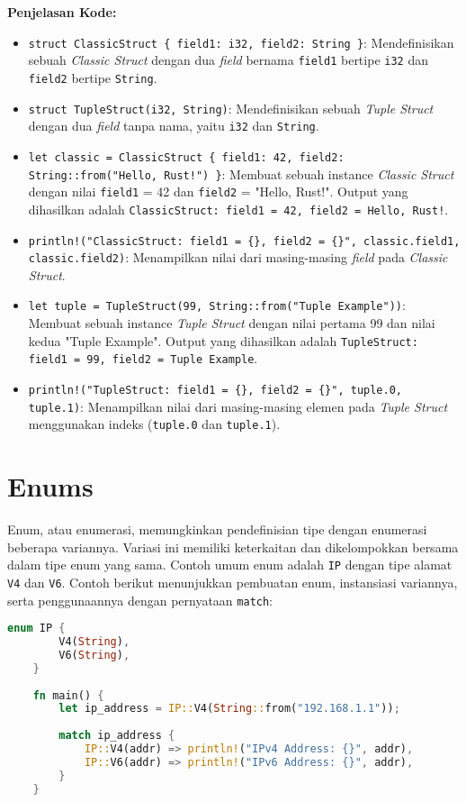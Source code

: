 \textbf{Penjelasan Kode:}
\begin{itemize}
	\item \texttt{struct ClassicStruct \{ field1: i32, field2: String \}}: Mendefinisikan sebuah \textit{Classic Struct} dengan dua \textit{field} bernama \texttt{field1} bertipe \texttt{i32} dan \texttt{field2} bertipe \texttt{String}.
	\item \texttt{struct TupleStruct(i32, String)}: Mendefinisikan sebuah \textit{Tuple Struct} dengan dua \textit{field} tanpa nama, yaitu \texttt{i32} dan \texttt{String}.
	\item \texttt{let classic = ClassicStruct \{ field1: 42, field2: String::from("Hello, Rust!") \}}: Membuat sebuah instance \textit{Classic Struct} dengan nilai \texttt{field1} = 42 dan \texttt{field2} = "Hello, Rust!". Output yang dihasilkan adalah \texttt{ClassicStruct: field1 = 42, field2 = Hello, Rust!}.
	\item \texttt{println!("ClassicStruct: field1 = \{\}, field2 = \{\}", classic.field1, classic.field2)}: Menampilkan nilai dari masing-masing \textit{field} pada \textit{Classic Struct}.
	\item \texttt{let tuple = TupleStruct(99, String::from("Tuple Example"))}: Membuat sebuah instance \textit{Tuple Struct} dengan nilai pertama 99 dan nilai kedua "Tuple Example". Output yang dihasilkan adalah \texttt{TupleStruct: field1 = 99, field2 = Tuple Example}.
	\item \texttt{println!("TupleStruct: field1 = \{\}, field2 = \{\}", tuple.0, tuple.1)}: Menampilkan nilai dari masing-masing elemen pada \textit{Tuple Struct} menggunakan indeks (\texttt{tuple.0} dan \texttt{tuple.1}).
\end{itemize}

\section{Enums}

Enum, atau enumerasi, memungkinkan pendefinisian tipe dengan enumerasi beberapa variannya. Variasi ini memiliki keterkaitan dan dikelompokkan bersama dalam tipe enum yang sama. Contoh umum enum adalah \texttt{IP} dengan tipe alamat \texttt{V4} dan \texttt{V6}. Contoh berikut menunjukkan pembuatan enum, instansiasi variannya, serta penggunaannya dengan pernyataan \texttt{match}:

\begin{lstlisting}[language=Rust, caption={Contoh Enum dalam Rust}]
	enum IP {
		V4(String),
		V6(String),
	}
	
	fn main() {
		let ip_address = IP::V4(String::from("192.168.1.1"));
		
		match ip_address {
			IP::V4(addr) => println!("IPv4 Address: {}", addr),
			IP::V6(addr) => println!("IPv6 Address: {}", addr),
		}
	}
\end{lstlisting}

